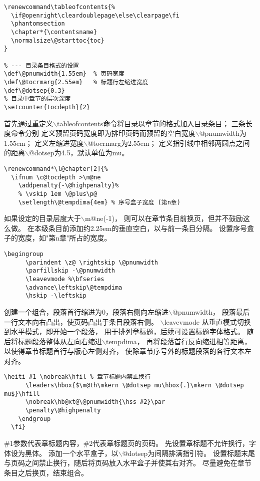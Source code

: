 \begin{lstlisting}[style=latex]
% --- 以章节格式添加目录
\renewcommand\tableofcontents{%
  \if@openright\cleardoublepage\else\clearpage\fi
  \phantomsection
  \chapter*{\contentsname}
  \normalsize\@starttoc{toc}
}

% --- 目录条目格式的设置
\def\@pnumwidth{1.55em}  % 页码宽度
\def\@tocrmarg{2.55em}   % 标题行左缩进宽度
\def\@dotsep{0.3}
% 目录中章节的层次深度
\setcounter{tocdepth}{2}
\end{lstlisting}
首先通过重定义$\backslash$tableofcontents命令将目录以章节的格式加入目录条目；
三条长度命令分别
定义预留页码宽度即为排印页码而预留的空白宽度$\backslash$@pnumwidth为1.55em；
定义左缩进宽度$\backslash$@tocrmarg为2.55em；
定义指引线中相邻两圆点之间的距离$\backslash$@dotsep为4.5，默认单位为mu。

\begin{lstlisting}[style=latex]
% 目录中的章标题格式
\renewcommand*\l@chapter[2]{%
  \ifnum \c@tocdepth >\m@ne
    \addpenalty{-\@highpenalty}%
    % \vskip 1em \@plus\p@
    \setlength\@tempdima{4em} % 序号盒子宽度 (第n章)
\end{lstlisting}
如果设定的目录层度大于$\backslash$m@ne(-1)，
则可以在章节条目前换页，但并不鼓励这么做。
在本级条目前添加约2.25em的垂直空白，以与前一条目分隔。
设置序号盒子的宽度，如"第n章"所占的宽度。

\begin{lstlisting}[style=latex]
    \begingroup
      \parindent \z@ \rightskip \@pnumwidth
      \parfillskip -\@pnumwidth
      \leavevmode %\bfseries
      \advance\leftskip\@tempdima
      \hskip -\leftskip
\end{lstlisting}
创建一个组合，段落首行缩进为0，段落右侧向左缩进$\backslash$@pnumwidth，
段落最后一行文本向右凸出，使页码凸出于条目段落右侧。
$\backslash$leavevmode 从垂直模式切换到水平模式，即开始一个段落，
用于排列章标题，后续可设置标题字体格式。
随后将标题段落整体从左向右缩进$\backslash$tempdima，
再将段落首行反向缩进相等距离，以使得章节标题首行与版心左侧对齐，
使除章节序号外的标题段落的各行文本左对齐。

\begin{lstlisting}[style=latex]
      \heiti #1 \nobreak\hfil % 章节标题内禁止换行
      \leaders\hbox{$\m@th\mkern \@dotsep mu\hbox{.}\mkern \@dotsep mu$}\hfill
      \nobreak\hb@xt@\@pnumwidth{\hss #2}\par
      \penalty\@highpenalty
    \endgroup
  \fi}
\end{lstlisting}
\#1参数代表章标题内容，\#2代表章标题页的页码。
先设置章标题不允许换行，字体设为黑体。
添加一个水平盒子，以$\backslash$@dotsep为间隔排满指引符。
设置标题末尾与页码之间禁止换行，随后将页码放入水平盒子并使其右对齐。
尽量避免在章节条目之后换页，结束组合。

